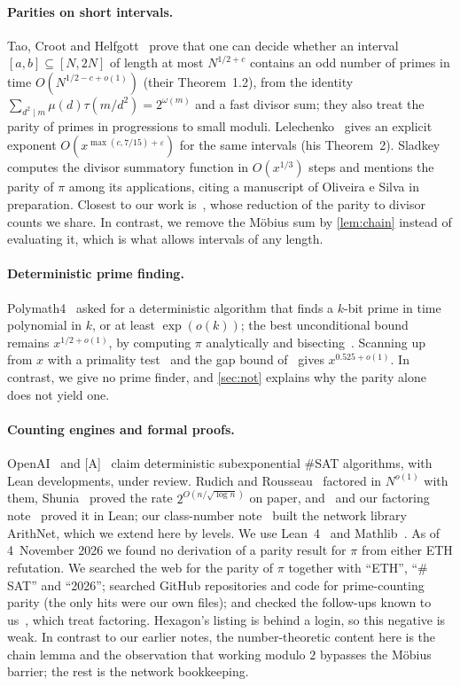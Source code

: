 \documentclass[10pt]{amsart}
\theoremstyle{plain}
\theoremstyle{definition}
\theoremstyle{remark}
\numberwithin{equation}{section}
\newcommand{\A}{\textup{[A]}}
\newcommand{\rate}{2^{O(n/\sqrt{\log n})}}
\begin{document}
\paragraph{Parities on short intervals.} Tao, Croot and Helfgott~\cite{TCH12} prove that one can decide
whether an interval $[a,b]\subseteq[N,2N]$ of length at most $N^{1/2+c}$ contains an odd number of primes
in time $O(N^{1/2-c+o(1)})$ (their Theorem~1.2), from the identity
$\sum_{d^2\mid m}\mu(d)\tau(m/d^2)=2^{\omega(m)}$ and a fast divisor sum; they also treat the parity of
primes in progressions to small moduli. Lelechenko~\cite{Lel13} gives an explicit exponent
$O(x^{\max(c,7/15)+\varepsilon})$ for the same intervals (his Theorem~2). Sladkey~\cite{Sla12} computes the
divisor summatory function in $O(x^{1/3})$ steps and mentions the parity of $\pi$ among its applications,
citing a manuscript of Oliveira e Silva in preparation. Closest to our work is~\cite{TCH12}, whose
reduction of the parity to divisor counts we share. In contrast, we remove the M\"obius sum by
\cref{lem:chain} instead of evaluating it, which is what allows intervals of any length.

\paragraph{Deterministic prime finding.} Polymath4~\cite{Tao09} asked for a deterministic algorithm that
finds a $k$-bit prime in time polynomial in $k$, or at least $\exp(o(k))$; the best unconditional bound
remains $x^{1/2+o(1)}$, by computing $\pi$ analytically and bisecting~\cite{LO87,TCH12}. Scanning up from
$x$ with a primality test~\cite{AKS04} and the gap bound of~\cite{BHP01} gives $x^{0.525+o(1)}$. In
contrast, we give no prime finder, and \cref{sec:not} explains why the parity alone does not yield one.

\paragraph{Counting engines and formal proofs.} OpenAI~\cite{OpenAI26} and \A~\cite{Anthropic26} claim
deterministic subexponential $\#$SAT algorithms, with Lean developments, under review. Rudich and
Rousseau~\cite{RR26} factored in $N^{o(1)}$ with them, Shunia~\cite{Shu26} proved the rate $\rate$ on
paper, and~\cite{IF26} and our factoring note~\cite{TulFac26} proved it in Lean; our class-number
note~\cite{TulCN26} built the network library ArithNet, which we extend here by levels. We use
Lean~4~\cite{Lean4} and Mathlib~\cite{Mathlib20}. As of 4~November 2026 we found no derivation of a
parity result for $\pi$ from either ETH refutation. We searched the web for the parity of $\pi$ together
with ``ETH'', ``$\#$SAT'' and ``2026''; searched GitHub repositories and code for prime-counting parity
(the only hits were our own files); and checked the follow-ups known to us~\cite{RR26,Shu26,IF26}, which
treat factoring. Hexagon's listing is behind a login, so this negative is weak. In contrast to our earlier
notes, the number-theoretic content here is the chain lemma and the observation that working modulo
$2$ bypasses the M\"obius barrier; the rest is the network bookkeeping.
\end{document}
